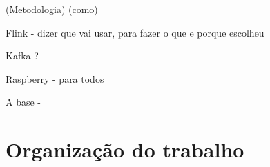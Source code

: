 (Metodologia) (como)

Flink  - dizer que vai usar, para fazer o que e porque escolheu 

Kafka ?

Raspberry - para todos

A base - 




\section{Organização do trabalho}
